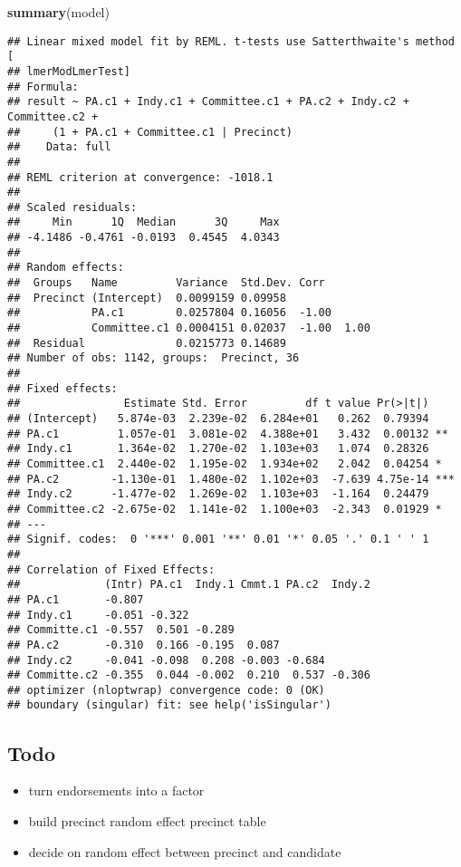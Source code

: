 \documentclass[
]{article}
\newenvironment{Shaded}{\begin{snugshade}}{\end{snugshade}}
\newcommand{\FunctionTok}[1]{\textcolor[rgb]{0.13,0.29,0.53}{\textbf{#1}}}
\newcommand{\NormalTok}[1]{#1}
\providecommand{\tightlist}{%
  \setlength{\itemsep}{0pt}\setlength{\parskip}{0pt}}
\begin{document}
\begin{Shaded}
\begin{Highlighting}[]
\FunctionTok{summary}\NormalTok{(model)}
\end{Highlighting}
\end{Shaded}

\begin{verbatim}
## Linear mixed model fit by REML. t-tests use Satterthwaite's method [
## lmerModLmerTest]
## Formula: 
## result ~ PA.c1 + Indy.c1 + Committee.c1 + PA.c2 + Indy.c2 + Committee.c2 +  
##     (1 + PA.c1 + Committee.c1 | Precinct)
##    Data: full
## 
## REML criterion at convergence: -1018.1
## 
## Scaled residuals: 
##     Min      1Q  Median      3Q     Max 
## -4.1486 -0.4761 -0.0193  0.4545  4.0343 
## 
## Random effects:
##  Groups   Name         Variance  Std.Dev. Corr       
##  Precinct (Intercept)  0.0099159 0.09958             
##           PA.c1        0.0257804 0.16056  -1.00      
##           Committee.c1 0.0004151 0.02037  -1.00  1.00
##  Residual              0.0215773 0.14689             
## Number of obs: 1142, groups:  Precinct, 36
## 
## Fixed effects:
##                Estimate Std. Error         df t value Pr(>|t|)    
## (Intercept)   5.874e-03  2.239e-02  6.284e+01   0.262  0.79394    
## PA.c1         1.057e-01  3.081e-02  4.388e+01   3.432  0.00132 ** 
## Indy.c1       1.364e-02  1.270e-02  1.103e+03   1.074  0.28326    
## Committee.c1  2.440e-02  1.195e-02  1.934e+02   2.042  0.04254 *  
## PA.c2        -1.130e-01  1.480e-02  1.102e+03  -7.639 4.75e-14 ***
## Indy.c2      -1.477e-02  1.269e-02  1.103e+03  -1.164  0.24479    
## Committee.c2 -2.675e-02  1.141e-02  1.100e+03  -2.343  0.01929 *  
## ---
## Signif. codes:  0 '***' 0.001 '**' 0.01 '*' 0.05 '.' 0.1 ' ' 1
## 
## Correlation of Fixed Effects:
##             (Intr) PA.c1  Indy.1 Cmmt.1 PA.c2  Indy.2
## PA.c1       -0.807                                   
## Indy.c1     -0.051 -0.322                            
## Committe.c1 -0.557  0.501 -0.289                     
## PA.c2       -0.310  0.166 -0.195  0.087              
## Indy.c2     -0.041 -0.098  0.208 -0.003 -0.684       
## Committe.c2 -0.355  0.044 -0.002  0.210  0.537 -0.306
## optimizer (nloptwrap) convergence code: 0 (OK)
## boundary (singular) fit: see help('isSingular')
\end{verbatim}

\hypertarget{todo}{%
\subsection{Todo}\label{todo}}

\begin{itemize}
\tightlist
\item
  turn endorsements into a factor
\item
  build precinct random effect precinct table
\item
  decide on random effect between precinct and candidate
\end{itemize}
\end{document}
